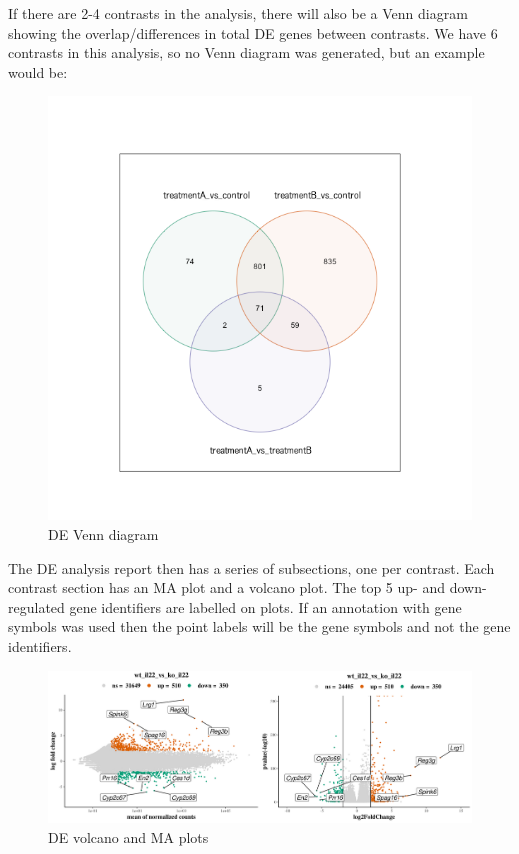 \documentclass[11pt]{article}
\makeatletter
\def\maxwidth{\ifdim\Gin@nat@width>\linewidth\linewidth
    \else\Gin@nat@width\fi}
\let\Oldincludegraphics\includegraphics
\renewcommand{\includegraphics}[1]{\Oldincludegraphics[width=.8\maxwidth, height=.55\textheight, keepaspectratio]{#1}}
\makeatother
\begin{document}
    If there are 2-4 contrasts in the analysis, there will also be a Venn
diagram showing the overlap/differences in total DE genes between
contrasts. We have 6 contrasts in this analysis, so no Venn diagram was
generated, but an example would be:

    \begin{figure}[H]
\centering
\includegraphics{images/DEvenn.png}
\caption{DE Venn diagram}
\end{figure}

    The DE analysis report then has a series of subsections, one per
contrast. Each contrast section has an MA plot and a volcano plot. The
top 5 up- and down-regulated gene identifiers are labelled on plots. If
an annotation with gene symbols was used then the point labels will be
the gene symbols and not the gene identifiers.

    \begin{figure}[H]
\centering
\includegraphics{images/DEvolcanoMA.png}
\caption{DE volcano and MA plots}
\end{figure}
\end{document}

